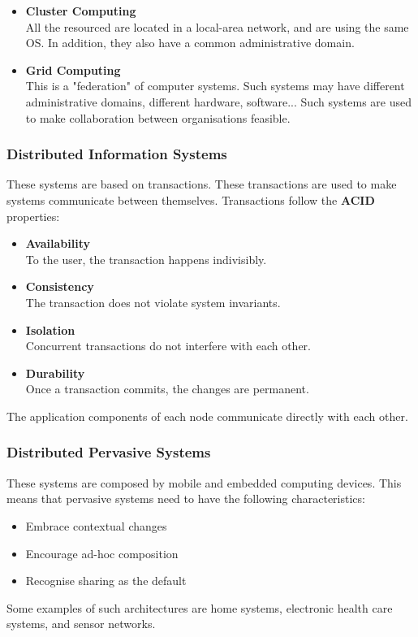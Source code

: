 \documentclass{article}
\begin{document}
\begin{itemize}
	\item \textbf{Cluster Computing} \\
	All the resourced are located in a local-area network, and are using the same OS. In addition, they also have a common administrative domain.
	
	\item \textbf{Grid Computing} \\
	This is a "federation" of computer systems. Such systems may have different administrative domains, different hardware, software... Such systems are used to make collaboration between organisations feasible.
\end{itemize}

\subsubsection{Distributed Information Systems}
These systems are based on transactions. These transactions are used to make systems communicate between themselves. Transactions follow the \textbf{ACID} properties:

\begin{itemize}
	\item \textbf{Availability} \\
	To the user, the transaction happens indivisibly.
	
	\item \textbf{Consistency} \\
	The transaction does not violate system invariants.
	
	\item \textbf{Isolation} \\
	Concurrent transactions do not interfere with each other.
	
	\item \textbf{Durability} \\
	Once a transaction commits, the changes are permanent.
\end{itemize}

\noindent The application components of each node communicate directly with each other.

\subsubsection{Distributed Pervasive Systems}
These systems are composed by mobile and embedded computing devices. This means that pervasive systems need to have the following characteristics:

\begin{itemize}
	\item Embrace contextual changes
	\item Encourage ad-hoc composition
	\item Recognise sharing as the default
\end{itemize}

\noindent Some examples of such architectures are home systems, electronic health care systems, and sensor networks.
\end{document}
